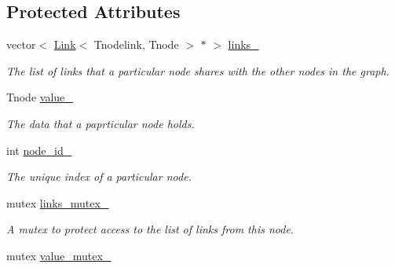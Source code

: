 \subsection*{Protected Attributes}
\begin{DoxyCompactItemize}
\item 
vector$<$ \hyperlink{classLink}{Link}$<$ Tnodelink, Tnode $>$ $\ast$ $>$ \hyperlink{classNode_a3dea74eaa1d5b3159bf1533e11e0cfda}{links\+\_\+}\hypertarget{classNode_a3dea74eaa1d5b3159bf1533e11e0cfda}{}\label{classNode_a3dea74eaa1d5b3159bf1533e11e0cfda}

\begin{DoxyCompactList}\small\item\em The list of links that a particular node shares with the other nodes in the graph. \end{DoxyCompactList}\item 
Tnode \hyperlink{classNode_a78be1747ae96cf39fe2a9ae3be5212a4}{value\+\_\+}\hypertarget{classNode_a78be1747ae96cf39fe2a9ae3be5212a4}{}\label{classNode_a78be1747ae96cf39fe2a9ae3be5212a4}

\begin{DoxyCompactList}\small\item\em The data that a paprticular node holds. \end{DoxyCompactList}\item 
int \hyperlink{classNode_a84fb338de56e4906d251f16bf27ee00f}{node\+\_\+id\+\_\+}\hypertarget{classNode_a84fb338de56e4906d251f16bf27ee00f}{}\label{classNode_a84fb338de56e4906d251f16bf27ee00f}

\begin{DoxyCompactList}\small\item\em The unique index of a particular node. \end{DoxyCompactList}\item 
mutex \hyperlink{classNode_af75893cb178fdcdd805df2d17c16a88b}{links\+\_\+mutex\+\_\+}\hypertarget{classNode_af75893cb178fdcdd805df2d17c16a88b}{}\label{classNode_af75893cb178fdcdd805df2d17c16a88b}

\begin{DoxyCompactList}\small\item\em A mutex to protect access to the list of links from this node. \end{DoxyCompactList}\item 
mutex \hyperlink{classNode_a846c5acc1ea3bfa722309b5b2ef8072e}{value\+\_\+mutex\+\_\+}\hypertarget{classNode_a846c5acc1ea3bfa722309b5b2ef8072e}{}\label{classNode_a846c5acc1ea3bfa722309b5b2ef8072e}


\end{DoxyCompactItemize}
